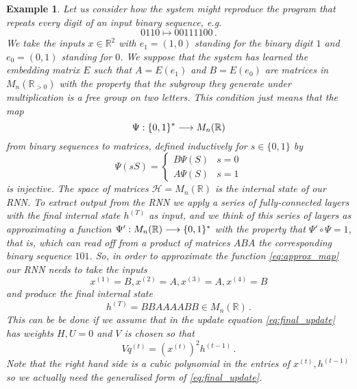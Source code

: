 \documentclass[english,letter paper,12pt,leqno]{article}
\theoremstyle{example}
\newtheorem{example}[theorem]{Example}
\numberwithin{equation}{section}
\def\be{\begin{equation}}
\def\ee{\end{equation}}
\begin{document}
\begin{example} Let us consider how the system might reproduce the program that repeats every digit of an input binary sequence, e.g.
\be\label{eq:approx_map}
0110 \longmapsto 00111100\,.
\ee
We take the inputs $x \in \mathbb{R}^2$ with $e_1 = (1,0)$ standing for the binary digit $1$ and $e_0 = (0,1)$ standing for $0$. We suppose that the system has learned the embedding matrix $E$ such that $A = E(e_1)$ and $B = E(e_0)$ are matrices in $M_n(\mathbb{R}_{>0})$ with the property that the subgroup they generate under multiplication is a free group on two letters. This condition just means that the map
\[
\Psi: \{0,1\}^* \longrightarrow M_n( \mathbb{R} )
\]
from binary sequences to matrices, defined inductively for $s \in \{0,1\}$ by
\[
\Psi( s S ) = \begin{cases} B \Psi(S) & s = 0 \\ A \Psi(S) & s = 1 \end{cases}
\]
is injective. The space of matrices $\mathscr{H} = M_n(\mathbb{R})$ is the internal state of our RNN. To extract output from the RNN we apply a series of fully-connected layers with the final internal state $h^{(T)}$ as input, and we think of this series of layers as approximating a function $\Psi': M_n(\mathbb{R}) \longrightarrow \{0,1\}^*$ with the property that $\Psi' \circ \Psi = 1$, that is, which can read off from a product of matrices $ABA$ the corresponding binary sequence $101$. So, in order to approximate the function \eqref{eq:approx_map} our RNN needs to take the inputs
\[
x^{(1)} = B, x^{(2)} = A, x^{(3)} = A, x^{(4)} = B
\]
and produce the final internal state
\[
h^{(T)} = BBAAAABB \in M_n(\mathbb{R})\,.
\]
This can be be done if we assume that in the update equation \eqref{eq:final_update} has weights $H, U = 0$ and $V$ is chosen so that
\[
V q^{(t)} = (x^{(t)})^2 h^{(t-1)}\,.
\]
Note that the right hand side is a cubic polynomial in the entries of $x^{(t)}, h^{(t-1)}$ so we actually need the generalised form of \eqref{eq:final_update}.
\end{example}
\end{document}
